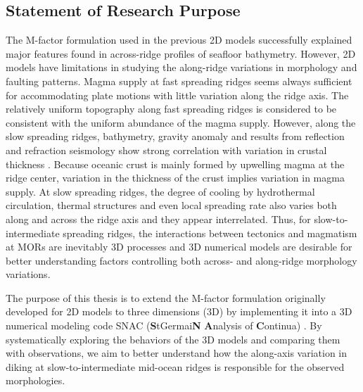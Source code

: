 \subsection{Statement of Research Purpose}

The M-factor formulation used in the previous 2D models \citep[e.g.,][]{Tucholke2008,Buck2005} successfully explained major features found in across-ridge profiles of seafloor bathymetry. However, 2D models have limitations in studying the along-ridge variations in morphology and faulting patterns. Magma supply at fast spreading ridges seems always sufficient for accommodating plate motions with little variation along the ridge axis. The relatively uniform topography along fast spreading ridges is considered to be consistent with the uniform abundance of the magma supply. However, along the slow spreading ridges, bathymetry, gravity anomaly and results from reflection and refraction seismology show strong correlation with variation in crustal thickness \citep[e.g.,][]{Ryan2009, Chen1999, Lin1990, Tolstoy1993}. Because oceanic crust is mainly formed by upwelling magma at the ridge center, variation in the thickness of the crust implies variation in magma supply. At slow spreading ridges, the degree of cooling by hydrothermal circulation, thermal structures and even local spreading rate \citep{Baines2008} also varies both along and across the ridge axis and they appear interrelated. Thus, for slow-to-intermediate spreading ridges, the interactions between tectonics and magmatism at MORs are inevitably 3D processes and 3D numerical models are desirable for better understanding factors controlling both across- and along-ridge morphology variations. 

The purpose of this thesis is to extend the M-factor formulation originally developed for 2D models to three dimensions (3D) by implementing it into a 3D numerical modeling code SNAC (\textbf{S}tGermai\textbf{N} \textbf{A}nalysis of \textbf{C}ontinua) \citep{Choi2008}. By systematically exploring the behaviors of the 3D models and comparing them with observations, we aim to better understand how the along-axis variation in diking at slow-to-intermediate mid-ocean ridges is responsible for the observed morphologies.

